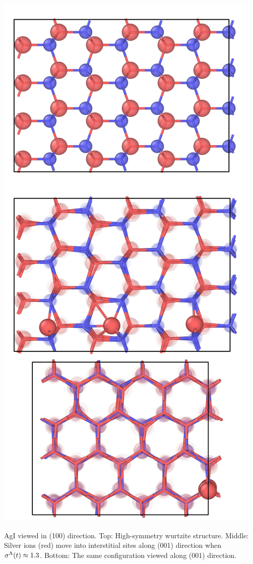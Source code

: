 \begin{marginfigure}
	\includegraphics[width=\textwidth]{./data/plots/defects/186.02.AgI/defects_all.png}
	\caption{AgI viewed in (100) direction. Top: High-symmetry wurtzite structure. Middle: Silver ions (red) move into interstitial sites along (001) direction when $\sigma^\mathrm{A} (t) \approx 1.3$. Bottom: The same configuration viewed along (001) direction.}
	\label{fig:defects.AgI.1}
\end{marginfigure} 
